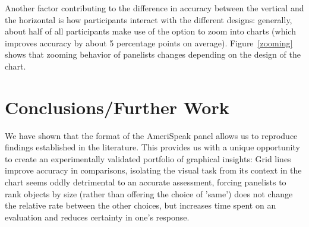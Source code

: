 \documentclass[10pt]{article}\usepackage[]{graphicx}\usepackage[table]{xcolor}
\begin{document}
Another factor contributing to the difference in accuracy between the vertical and the horizontal is how participants interact with the different designs: generally, about half of all participants make use of the option to zoom into charts (which improves accuracy by about 5 percentage points on average).  Figure~\ref{zooming} shows that zooming behavior of panelists changes depending on the design of the chart. 

\section{Conclusions/Further Work}
We have shown that the format of the AmeriSpeak panel allows us to reproduce findings established in the literature.  This provides us with a unique opportunity to create an experimentally validated portfolio of graphical insights:
Grid lines improve accuracy in comparisons, isolating the visual task from its context in the chart seems oddly detrimental to an accurate assessment, forcing panelists to rank objects by size (rather than offering the choice of 'same') does not change the relative rate between the other choices, but increases time spent on an evaluation and reduces certainty in one's response. 
%
\vspace{-10pt}

\end{document}
